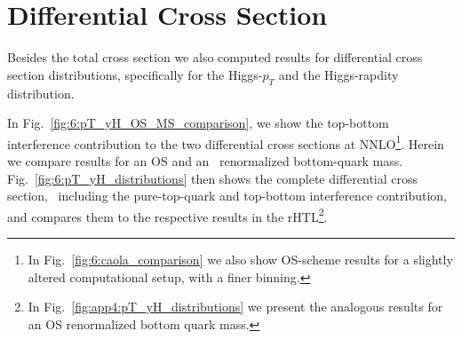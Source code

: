 \section{Differential Cross Section}
Besides the total cross section we also computed results for differential cross section distributions, specifically for the Higgs-$p_T$ and the Higgs-rapdity distribution.

In Fig.~\ref{fig:6:pT_yH_OS_MS_comparison}, we show the top-bottom interference contribution to the two differential cross sections at \acs{NNLO}\footnote{In Fig.~\ref{fig:6:caola_comparison} we also show \acs{OS}-scheme results for a slightly altered computational setup, with a finer binning.}. Herein we compare results for an \acs{OS} and an \MS\ renormalized bottom-quark mass. Fig.~\ref{fig:6:pT_yH_distributions} then shows the complete differential cross section, \ie\ including the pure-top-quark and top-bottom interference contribution, and compares them to the respective results in the \acs{rHTL}\footnote{In Fig.~\ref{fig:app4:pT_yH_distributions} we present the analogous results for an \acs{OS} renormalized bottom quark mass.}.
